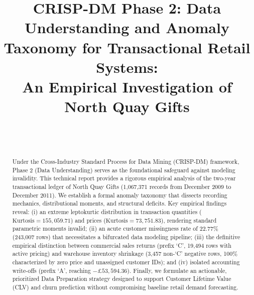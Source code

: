 \documentclass[journal,10pt,twocolumn]{IEEEtran}
\begin{document}
\title{CRISP-DM Phase 2: Data Understanding and Anomaly Taxonomy for Transactional Retail Systems:\\
An Empirical Investigation of North Quay Gifts}

\author{
    \\
    \\
}

\maketitle

\begin{abstract}
Under the Cross-Industry Standard Process for Data Mining (CRISP-DM) framework, Phase 2 (Data Understanding) serves as the foundational safeguard against modeling invalidity. This technical report provides a rigorous empirical analysis of the two-year transactional ledger of North Quay Gifts (1,067,371 records from December 2009 to December 2011). We establish a formal anomaly taxonomy that dissects recording mechanics, distributional moments, and structural deficits. Key empirical findings reveal: (i) an extreme leptokurtic distribution in transaction quantities ($\text{Kurtosis} = 155,059.71$) and prices ($\text{Kurtosis} = 73,751.83$), rendering standard parametric moments invalid; (ii) an acute customer missingness rate of 22.77\% (243,007 rows) that necessitates a bifurcated data modeling pipeline; (iii) the definitive empirical distinction between commercial sales returns (prefix `C', 19,494 rows with active pricing) and warehouse inventory shrinkage (3,457 non-`C' negative rows, 100\% characterized by zero price and unassigned customer IDs); and (iv) isolated accounting write-offs (prefix `A', reaching $-\pounds 53,594.36$). Finally, we formulate an actionable, prioritized Data Preparation strategy designed to support Customer Lifetime Value (CLV) and churn prediction without compromising baseline retail demand forecasting.
\end{abstract}
\end{document}
